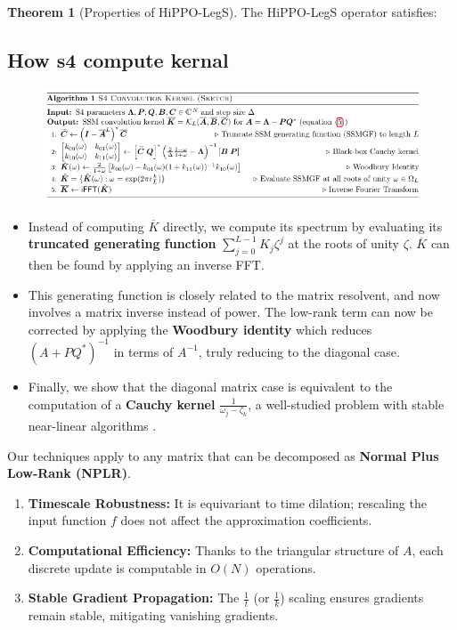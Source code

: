 \documentclass{article}
\theoremstyle{definition}
\newtheorem{theorem}{Theorem}[section]
\begin{document}
\begin{theorem}[Properties of HiPPO-LegS]
The HiPPO-LegS operator satisfies:
\subsection{How s4  compute kernal }
\label{appendix:s4 algorithm}


\begin{figure}[h]
    \centering
    \includegraphics[width=\textwidth]{s4.png}
    
    \label{fig:myimage}
\end{figure}



\begin{itemize}
    \item Instead of computing $\overline{K}$ directly, we compute its spectrum by evaluating its \textbf{truncated generating function} $\sum_{j=0}^{L-1} K_j \zeta^j$ at the roots of unity $\zeta$. $\overline{K}$ can then be found by applying an inverse FFT.
    \item This generating function is closely related to the matrix resolvent, and now involves a matrix inverse instead of power. The low-rank term can now be corrected by applying the \textbf{Woodbury identity} which reduces $(A + PQ^*)^{-1}$ in terms of $A^{-1}$, truly reducing to the diagonal case.
    \item Finally, we show that the diagonal matrix case is equivalent to the computation of a \textbf{Cauchy kernel} $\frac{1}{\omega_j - \zeta_k}$, a well-studied problem with stable near-linear algorithms \cite{[30],[31]}.
\end{itemize}

Our techniques apply to any matrix that can be decomposed as \textbf{Normal Plus Low-Rank (NPLR)}.



\begin{enumerate}
  \item \textbf{Timescale Robustness:} It is equivariant to time dilation; rescaling the input function \( f \) does not affect the approximation coefficients.
  \item \textbf{Computational Efficiency:} Thanks to the triangular structure of \( A \), each discrete update is computable in \( O(N) \) operations.
  \item \textbf{Stable Gradient Propagation:} The \( \frac{1}{t} \) (or \( \frac{1}{k} \)) scaling ensures gradients remain stable, mitigating vanishing gradients.
\end{enumerate}
\end{theorem}
\end{document}
